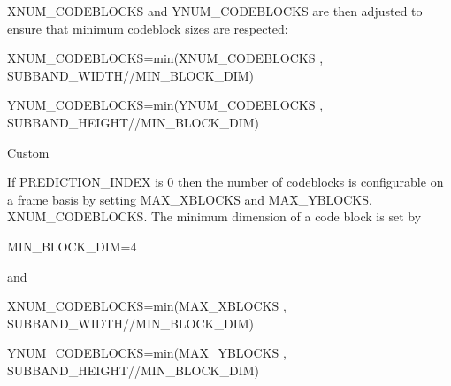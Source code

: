 XNUM\_CODEBLOCKS and YNUM\_CODEBLOCKS are then adjusted to ensure that
minimum codeblock sizes are respected:

XNUM\_CODEBLOCKS=min(XNUM\_CODEBLOCKS , SUBBAND\_WIDTH//MIN\_BLOCK\_DIM)

YNUM\_CODEBLOCKS=min(YNUM\_CODEBLOCKS , SUBBAND\_HEIGHT//MIN\_BLOCK\_DIM)

Custom

If PREDICTION\_INDEX is 0 then the number of codeblocks is configurable
on a frame basis by setting MAX\_XBLOCKS and MAX\_YBLOCKS.
XNUM\_CODEBLOCKS. The minimum dimension of a code block is set by

MIN\_BLOCK\_DIM=4

and

XNUM\_CODEBLOCKS=min(MAX\_XBLOCKS , SUBBAND\_WIDTH//MIN\_BLOCK\_DIM)

YNUM\_CODEBLOCKS=min(MAX\_YBLOCKS , SUBBAND\_HEIGHT//MIN\_BLOCK\_DIM)


